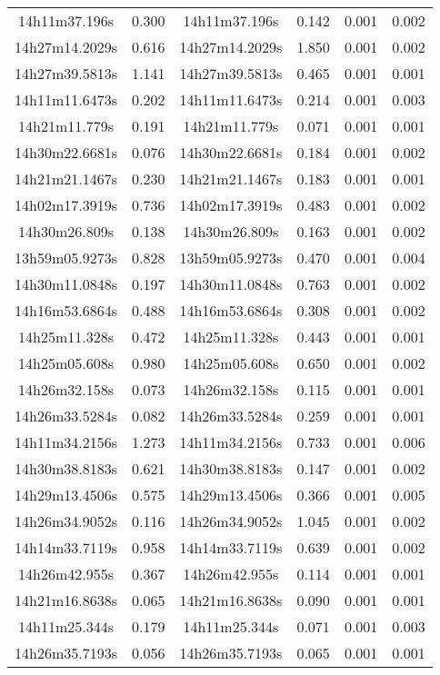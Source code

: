 \begin{table}
\begin{tabular}{cccccc}
14h11m37.196s & 0.300 & 14h11m37.196s & 0.142 & 0.001 & 0.002 \\
14h27m14.2029s & 0.616 & 14h27m14.2029s & 1.850 & 0.001 & 0.002 \\
14h27m39.5813s & 1.141 & 14h27m39.5813s & 0.465 & 0.001 & 0.001 \\
14h11m11.6473s & 0.202 & 14h11m11.6473s & 0.214 & 0.001 & 0.003 \\
14h21m11.779s & 0.191 & 14h21m11.779s & 0.071 & 0.001 & 0.001 \\
14h30m22.6681s & 0.076 & 14h30m22.6681s & 0.184 & 0.001 & 0.002 \\
14h21m21.1467s & 0.230 & 14h21m21.1467s & 0.183 & 0.001 & 0.001 \\
14h02m17.3919s & 0.736 & 14h02m17.3919s & 0.483 & 0.001 & 0.002 \\
14h30m26.809s & 0.138 & 14h30m26.809s & 0.163 & 0.001 & 0.002 \\
13h59m05.9273s & 0.828 & 13h59m05.9273s & 0.470 & 0.001 & 0.004 \\
14h30m11.0848s & 0.197 & 14h30m11.0848s & 0.763 & 0.001 & 0.002 \\
14h16m53.6864s & 0.488 & 14h16m53.6864s & 0.308 & 0.001 & 0.002 \\
14h25m11.328s & 0.472 & 14h25m11.328s & 0.443 & 0.001 & 0.001 \\
14h25m05.608s & 0.980 & 14h25m05.608s & 0.650 & 0.001 & 0.002 \\
14h26m32.158s & 0.073 & 14h26m32.158s & 0.115 & 0.001 & 0.001 \\
14h26m33.5284s & 0.082 & 14h26m33.5284s & 0.259 & 0.001 & 0.001 \\
14h11m34.2156s & 1.273 & 14h11m34.2156s & 0.733 & 0.001 & 0.006 \\
14h30m38.8183s & 0.621 & 14h30m38.8183s & 0.147 & 0.001 & 0.002 \\
14h29m13.4506s & 0.575 & 14h29m13.4506s & 0.366 & 0.001 & 0.005 \\
14h26m34.9052s & 0.116 & 14h26m34.9052s & 1.045 & 0.001 & 0.002 \\
14h14m33.7119s & 0.958 & 14h14m33.7119s & 0.639 & 0.001 & 0.002 \\
14h26m42.955s & 0.367 & 14h26m42.955s & 0.114 & 0.001 & 0.001 \\
14h21m16.8638s & 0.065 & 14h21m16.8638s & 0.090 & 0.001 & 0.001 \\
14h11m25.344s & 0.179 & 14h11m25.344s & 0.071 & 0.001 & 0.003 \\
14h26m35.7193s & 0.056 & 14h26m35.7193s & 0.065 & 0.001 & 0.001 \\

\end{tabular}
\end{table}
